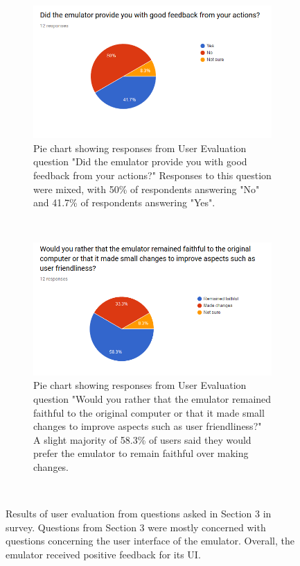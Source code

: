 \documentclass{l4proj}
\begin{document}
\begin{figure}[!t]
\begin{subfigure}[t]{0.45\textwidth}
		\label{fig:chart-2}
	\end{subfigure}
	~
	\begin{subfigure}[t]{0.45\textwidth}
		\includegraphics[width=\textwidth]{images/chart-3}
		\caption{Pie chart showing responses from User Evaluation question "Did the emulator provide you with good feedback from your actions?" Responses to this question were mixed, with 50\% of respondents answering "No" and 41.7\% of respondents answering "Yes".}
		\label{fig:chart-3}
	\end{subfigure}
	~ %
	\begin{subfigure}[t]{0.45\textwidth}
		\includegraphics[width=\textwidth]{images/chart-4}
		\caption{Pie chart showing responses from User Evaluation question "Would you rather that the emulator remained faithful to the original computer or that it made small changes to improve aspects such as user friendliness?" A slight majority of 58.3\% of users said they would prefer the emulator to remain faithful over making changes.}
		\label{fig:chart-4}
	\end{subfigure}
	~ %
	\caption{Results of user evaluation from questions asked in Section 3 in survey. Questions from Section 3 were mostly concerned with questions concerning the user interface of the emulator. Overall, the emulator received positive feedback for its UI.}
	\label{fig:eval-ui}
\end{figure}
\end{document}
